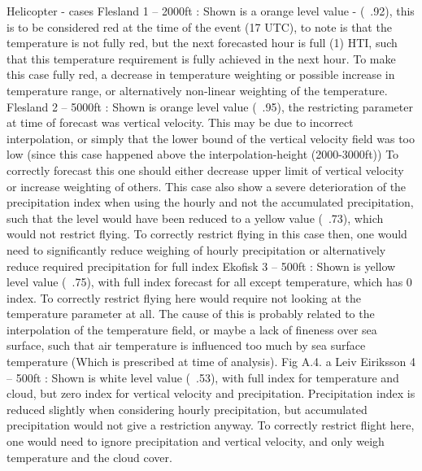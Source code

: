 Helicopter - cases
Flesland 1 – 2000ft :  Shown is a orange level value - (~.92), this is to be considered red at the time of the event (17 UTC), to note is that the temperature is not fully red, but the next forecasted hour is full (1) HTI, such that this temperature requirement is fully achieved in the next hour. To make this case fully red, a decrease in temperature weighting or possible increase in temperature range, or alternatively non-linear weighting of the temperature.
Flesland 2 – 5000ft : Shown is orange level value (~.95), the restricting parameter at time of forecast was vertical velocity. This may be due to incorrect interpolation, or simply that the lower bound of the vertical velocity field was too low (since this case happened above the interpolation-height (2000-3000ft)) To correctly forecast this one should either decrease upper limit of vertical velocity or increase weighting of others. This case also show a severe deterioration of the precipitation index when using the hourly and not the accumulated precipitation, such that the level would have been reduced to a yellow value (~.73), which would not restrict flying. To correctly restrict flying in this case then, one would need to significantly reduce weighing of hourly precipitation or alternatively reduce required precipitation for full index
Ekofisk 3 – 500ft : Shown is yellow level value (~.75), with full index forecast for all except temperature, which has 0 index. To correctly restrict flying here would require not looking at the temperature parameter at all. The cause of this is probably related to the interpolation of the temperature field, or maybe a lack of fineness over sea surface, such that air temperature is influenced too much by sea surface temperature (Which is prescribed at time of analysis). Fig A.4. a
Leiv Eiriksson 4 – 500ft :  Shown is white level value (~.53), with full index for temperature and cloud, but zero index for vertical velocity and precipitation. Precipitation index is reduced slightly when considering hourly precipitation, but accumulated precipitation would not give a restriction anyway. To correctly restrict flight here, one would need to ignore precipitation and vertical velocity, and only weigh temperature and the cloud cover. 

